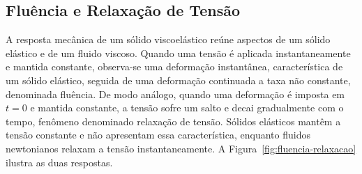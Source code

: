 \documentclass[arial,centeredequations,english,brazilian,oneside,section=TITLE]{ifes8}
\begin{document}
\subsection{Fluência e Relaxação de Tensão}
\label{sub:fluencia-relaxacao}

A resposta mecânica de um sólido viscoelástico reúne aspectos de um sólido elástico
e de um fluido viscoso. Quando uma tensão é aplicada
instantaneamente e mantida constante, observa-se uma deformação instantânea,
característica de um sólido elástico, seguida de uma deformação continuada a taxa não
constante, denominada fluência. De modo análogo, quando uma
deformação é imposta em $t = 0$ e mantida constante, a tensão sofre um salto e decai
gradualmente com o tempo, fenômeno denominado relaxação de tensão. Sólidos elásticos
mantêm a tensão constante e não apresentam essa característica, enquanto fluidos
newtonianos relaxam a tensão instantaneamente. A
Figura~\ref{fig:fluencia-relaxacao} ilustra as duas respostas.
\end{document}
